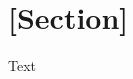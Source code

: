 \documentclass[11pt]{article}
\numberwithin{figure}{section}
\numberwithin{table}{section}
\numberwithin{equation}{section}
\begin{document}
\section{[Section]}


Text 



\end{document}
